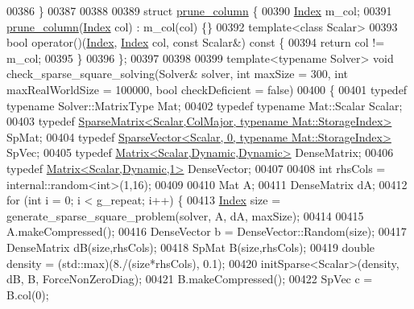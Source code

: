 \begin{DoxyCode}
00386 \}
00387 
00388 
00389 \textcolor{keyword}{struct }\hyperlink{structprune__column}{prune\_column} \{
00390   \hyperlink{namespace_eigen_a62e77e0933482dafde8fe197d9a2cfde}{Index} m\_col;
00391   \hyperlink{structprune__column}{prune\_column}(\hyperlink{namespace_eigen_a62e77e0933482dafde8fe197d9a2cfde}{Index} col) : m\_col(col) \{\}
00392   \textcolor{keyword}{template}<\textcolor{keyword}{class} Scalar>
00393   \textcolor{keywordtype}{bool} operator()(\hyperlink{namespace_eigen_a62e77e0933482dafde8fe197d9a2cfde}{Index}, \hyperlink{namespace_eigen_a62e77e0933482dafde8fe197d9a2cfde}{Index} col, \textcolor{keyword}{const} Scalar&)\textcolor{keyword}{ const }\{
00394     \textcolor{keywordflow}{return} col != m\_col;
00395   \}
00396 \};
00397 
00398 
00399 \textcolor{keyword}{template}<\textcolor{keyword}{typename} Solver> \textcolor{keywordtype}{void} check\_sparse\_square\_solving(Solver& solver, \textcolor{keywordtype}{int} maxSize = 300, \textcolor{keywordtype}{int} 
      maxRealWorldSize = 100000, \textcolor{keywordtype}{bool} checkDeficient = \textcolor{keyword}{false})
00400 \{
00401   \textcolor{keyword}{typedef} \textcolor{keyword}{typename} Solver::MatrixType Mat;
00402   \textcolor{keyword}{typedef} \textcolor{keyword}{typename} Mat::Scalar Scalar;
00403   \textcolor{keyword}{typedef} \hyperlink{group___sparse_core___module_class_eigen_1_1_sparse_matrix}{SparseMatrix<Scalar,ColMajor, typename Mat::StorageIndex>}
       SpMat;
00404   \textcolor{keyword}{typedef} \hyperlink{group___sparse_core___module_class_eigen_1_1_sparse_vector}{SparseVector<Scalar, 0, typename Mat::StorageIndex>}
       SpVec;
00405   \textcolor{keyword}{typedef} \hyperlink{group___core___module}{Matrix<Scalar,Dynamic,Dynamic>} DenseMatrix;
00406   \textcolor{keyword}{typedef} \hyperlink{group___core___module}{Matrix<Scalar,Dynamic,1>} DenseVector;
00407 
00408   \textcolor{keywordtype}{int} rhsCols = internal::random<int>(1,16);
00409 
00410   Mat A;
00411   DenseMatrix dA;
00412   \textcolor{keywordflow}{for} (\textcolor{keywordtype}{int} i = 0; i < g\_repeat; i++) \{
00413     \hyperlink{namespace_eigen_a62e77e0933482dafde8fe197d9a2cfde}{Index} size = generate\_sparse\_square\_problem(solver, A, dA, maxSize);
00414 
00415     A.makeCompressed();
00416     DenseVector b = DenseVector::Random(size);
00417     DenseMatrix dB(size,rhsCols);
00418     SpMat B(size,rhsCols);
00419     \textcolor{keywordtype}{double} density = (std::max)(8./(size*rhsCols), 0.1);
00420     initSparse<Scalar>(density, dB, B, ForceNonZeroDiag);
00421     B.makeCompressed();
00422     SpVec c = B.col(0);

\end{DoxyCode}
